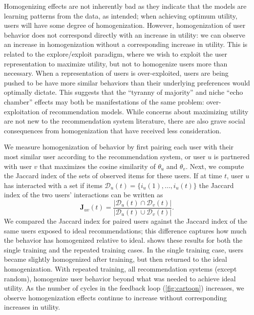 \documentclass[sigconf]{acmart}
\begin{document}
Homogenizing effects are not inherently bad as they indicate that the models are learning patterns from the data, as intended; when achieving optimum utility, users will have some degree of homogenization.  However, homogenization of user behavior does not correspond directly with an increase in utility: we can observe an increase in homogenization without a corresponding increase in utility.  This is related to the explore/exploit paradigm, where we wish to exploit the user representation to maximize utility, but not to homogenize users more than necessary.  When a representation of users is over-exploited, users are being pushed to be have more similar behaviors than their underlying preferences would optimally dictate.  This suggests that the ``tyranny of majority'' and niche ``echo chamber'' effects may both be manifestations of the same problem: over-exploitation of recommendation models.  While concerns about maximizing utility are not new to the recommendation system literature, there are also grave social consequences from homogenization that have received less consideration.

We measure homogenization of behavior by first pairing each user with their most similar user according to the recommendation system, or user $u$ is partnered with user $v$ that maximizes the cosine similarity of $\theta_u$ and $\theta_v$.  Next, we compute the Jaccard index of the sets of observed items for these users.  If at time $t$, user $u$ has interacted with a set if items $\mathcal{D}_u(t) = \{i_u(1), \dots, i_u(t)\}$ the Jaccard index of the two users' interactions can be written as
\begin{equation}
\mathbf{J}_{uv}(t) = \frac{\vert \mathcal{D}_u(t) \cap \mathcal{D}_v(t) \vert}{\vert \mathcal{D}_u(t) \cup \mathcal{D}_v(t) \vert}.
\end{equation}
We compared the Jaccard index for paired users against the Jaccard index of the same users exposed to ideal recommendations; this difference captures how much the behavior has homogenized relative to ideal.   shows these results for both the single training and the repeated training cases.
In the single training case, users became slightly homogenized after training, but then returned to the ideal homogenization.  With repeated training, all recommendation systems (except random), homogenize user behavior beyond what was needed to achieve ideal utility.  As the number of cycles in the feedback loop (\cref{fig:cartoon}) increases, we observe homogenization effects continue to increase without corresponding increases in utility.
\end{document}
